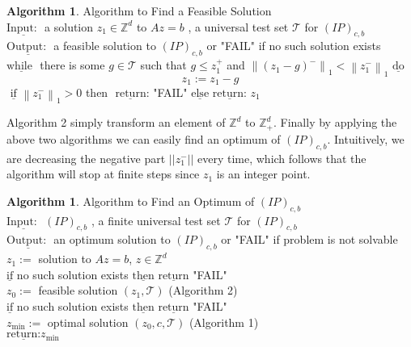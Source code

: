 \documentclass{article}
\theoremstyle{plain}
\theoremstyle{definition}
\newtheorem{algorithm}[theorem]{Algorithm}
\begin{document}
\begin{algorithm}Algorithm to Find a Feasible Solution \\
$ \underline{\text {Input: }}$ a solution  $z_{1} \in \mathbb{Z}^{d}$  to  $A z=b$ , a universal test set  $\mathcal{T}$  for  $(I P)_{c, b}$ \\
$ \underline{\text {Output: }}$ a feasible solution to  $(I P)_{c, b}$  or "FAIL" if no such solution exists\\
$\underline{\text {while }}$ there is some  $g \in \mathcal{T}$  such that  $g \leq z_{1}^{+}$ and  $\left\|\left(z_{1}-g\right)^{-}\right\|_{1}<\left\|z_{1}^{-}\right\|_{1}$  $\underline{\text{do}} $\\
$$z_{1}:=z_{1}-g$$
$ \underline{\text { if }}\left\|z_{1}^{-}\right\|_{1}>0$  then $\underline{\text { return:}}$  "FAIL" $\underline{\text{else}}$ $\underline{\text{return:}}$  $z_{1}$ 
\end{algorithm}

Algorithm 2 simply transform an element  of $\mathbb{Z}^{d}$  to $\mathbb{Z}_{+}^{d}$. Finally by applying the above two algorithms we can easily find an optimum of  $(IP)_{c,b}$. Intuitively, we are decreasing the negative part $||z_1^{-}||$ every time, which follows that the algorithm will stop at finite steps since $z_1$ is an integer point. 

\begin{algorithm} Algorithm to Find an Optimum of  $(I P)_{c, b}$  \\
$ \underline{\text {Input: }}$ $ (I P)_{c, b}$ , a finite universal test set  $\mathcal{T}$  for $(I P)_{c, b}$ \\
$\underline{\text {Output: }}$ an optimum solution to $ (I P)_{c, b}$  or "FAIL" if problem is not solvable \\
$ z_{1}:=$  solution to  $A z=b$, $z \in \mathbb{Z}^{d} $ \\
$\underline{\text{if}}$ no such solution exists $\underline{\text{then}}$ $\underline{\text{return}}$ "FAIL" \\
$ z_{0}:=$  feasible solution  $\left(z_{1}, \mathcal{T}\right) $ (Algorithm 2) \\
$\underline{\text{if}}$ no such solution exists $\underline{\text{then}}$ $\underline{\text{return}}$ "FAIL" \\
$z_{\min }:=$  optimal solution  $\left(z_{0}, c, \mathcal{T}\right) $  (Algorithm 1) \\
$\underline{\text {return:}} z_{\min }$  
\end{algorithm}
\end{document}
